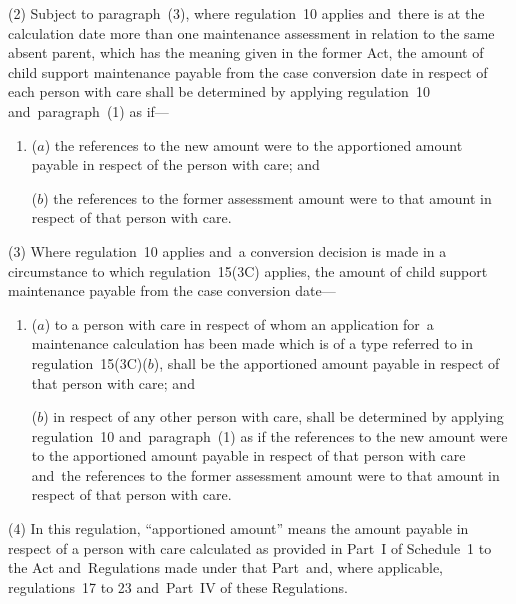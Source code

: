 \documentclass[12pt,a4paper]{article}
\begin{document}
(2) Subject to paragraph~(3), where regulation~10 applies and~there is at the calculation date more than one maintenance assessment in relation to the same absent parent, which has the meaning given in the former Act, the amount of child support maintenance payable from the case conversion date in respect of each person with care shall be determined by applying regulation~10 and~paragraph~(1) as if—
\begin{enumerate}\item[]
($a$) the references to the new amount were to the apportioned amount payable in respect of the person with care; and

($b$) the references to the former assessment amount were to that amount in respect of that person with care.
\end{enumerate}

(3) Where regulation~10 applies and~a conversion decision is made in a circumstance to which regulation~15(3C) applies, the amount of child support maintenance payable from the case conversion date—
\begin{enumerate}\item[]
($a$) to a person with care in respect of whom an application for~a maintenance calculation has been made 
which is of a type referred to in regulation~15(3C)($b$), shall be the apportioned amount payable in respect of that person with care; and

($b$) in respect of any other person with care, shall be determined by applying regulation~10 and~paragraph~(1) as if the references to the new amount were to the apportioned amount payable in respect of that person with care and~the references to the former assessment amount were to that amount in respect of that person with care.
\end{enumerate}

(4) In this regulation, “apportioned amount” means the amount payable in respect of a person with care calculated as provided in Part~I of Schedule~1 to the Act and~Regulations made under that Part~and, where applicable, regulations~17 to 23 and~Part~IV of these Regulations.

\end{document}
